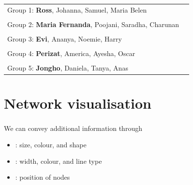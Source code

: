 \documentclass[8pt]{beamer}
\begin{document}

\begin{frame}
\frametitle{\insertsection}


\begin{table}
\begin{tabular}{ll}
\toprule
Group 1: \textbf{Ross}, Johanna, Samuel, Maria Belen\\
\\
Group 2: \textbf{Maria Fernanda}, Poojani, Saradha, Charunan\\
\\
Group 3: \textbf{Evi}, Ananya, Noemie, Harry\\
\\				
Group 4: \textbf{Perizat}, America, Ayesha, Oscar\\
\\
Group 5: \textbf{Jongho}, Daniela, Tanya, Anas\\
\bottomrule
\end{tabular}
\end{table}

\end{frame}




\section{Network visualisation}

\bgroup
{}
\begin{frame}[plain]{}
\begin{center}
\color{white}{\Huge\insertsection}
\end{center}
\end{frame}
\egroup

\begin{frame}
\frametitle{\insertsection}

We can convey additional information through
\begin{itemize}
\item {\color{blue}{Nodes}}: size, colour, and shape
\item {\color{blue}{Edges}}: width, colour, and line type
\item {\color{blue}{Layout}}: position of nodes
\end{itemize}
 
\end{frame}
\end{document}
